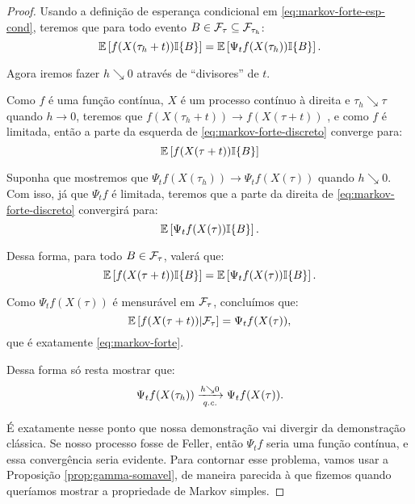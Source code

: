 \begin{proof}
  Usando a definição de esperança condicional em
  \eqref{eq:markov-forte-esp-cond}, teremos que para todo evento $B
  \in {\mathcal{F}}_{\tau} \subseteq {\mathcal{F}}_{\tau_h}$:
  \begin{equation}
    \label{eq:markov-forte-discreto}
    {\mathbb{E}} \left[ f(X(\tau_h + t)) {\mathbb{I}}\{B\} \right]
    = {\mathbb{E}} \left[ \Psi_t f (X(\tau_h)) {\mathbb{I}}\{B\} \right].
  \end{equation}

  Agora iremos fazer $h \searrow 0$ através de ``divisores'' de $t$.

  Como $f$ é uma função contínua, $X$ é um processo contínuo à direita
  e $\tau_h \searrow \tau$ quando $h \to 0$, teremos que $f(X(\tau_h + t))
  \to f(X(\tau + t))$ \qc, e como $f$ é limitada, então a parte da
  esquerda de \eqref{eq:markov-forte-discreto} converge para:
  \begin{displaymath}
    {\mathbb{E}} \left[ f(X(\tau + t)) {\mathbb{I}}\{B\} \right]
  \end{displaymath}

  Suponha que mostremos que $\Psi_t f (X(\tau_h)) \to \Psi_t
  f(X(\tau))$ \qc quando $h \searrow 0$. Com isso, já que $\Psi_t f$ é
  limitada, teremos que a parte da direita de
  \eqref{eq:markov-forte-discreto} convergirá para:
  \begin{displaymath}
    {\mathbb{E}} \left[ \Psi_t f (X(\tau)) {\mathbb{I}}\{B\} \right].
  \end{displaymath}

  Dessa forma, para todo $B \in {\mathcal{F}}_{\tau}$, valerá que:
  \begin{displaymath}
    {\mathbb{E}} \left[ f(X(\tau + t)) {\mathbb{I}}\{B\} \right]
    = {\mathbb{E}} \left[ \Psi_t f (X(\tau)) {\mathbb{I}}\{B\} \right].
  \end{displaymath}

  Como $\Psi_t f(X(\tau))$ é mensurável em ${\mathcal{F}}_\tau$, concluímos que:
  \begin{displaymath}
    {\mathbb{E}} \left[ f(X(\tau + t)) \middle| {\mathcal{F}}_\tau \right]
    = \Psi_t f (X(\tau)),
  \end{displaymath}
  que é exatamente \eqref{eq:markov-forte}.

  Dessa forma só resta mostrar que:
  \begin{equation}
    \label{eq:convergencia-discretizacao-1}
    \Psi_t f (X(\tau_h)) \xrightarrow[{\emph{q.c.}}]{h \searrow 0}
    \Psi_t f(X(\tau)).
  \end{equation}
  
  É exatamente nesse ponto que nossa demonstração vai divergir da
  demonstração clássica. Se nosso processo fosse de Feller, então
  $\Psi_t f$ seria uma função contínua, e essa convergência seria
  evidente. Para contornar esse problema, vamos usar a Proposição
  \ref{prop:gamma-somavel}, de maneira parecida à que fizemos quando
  queríamos mostrar a propriedade de Markov simples.


\end{proof}
